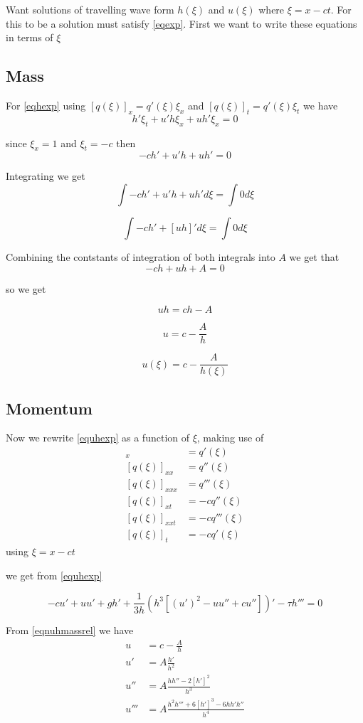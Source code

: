\documentclass[subeqn]{article}
\begin{document}
Want solutions of travelling wave form $h(\xi)$ and $u(\xi)$ where $\xi = x - ct$. For this to be a solution must satisfy \eqref{eqexp}. First we want to write these equations in terms of $\xi$

\subsection{Mass}

For \eqref{eqhexp} using $[q(\xi)]_x = q'(\xi)\xi_x$ and $[q(\xi)]_t = q'(\xi)\xi_t$ we have
\[h' \xi_t + u'h\xi_x + u h'\xi_x = 0\]

since $\xi_x = 1$ and $\xi_t = -c$ then
\[-c h' + u'h + u h' = 0\]

Integrating we get
\[ \int -c h' + u'h + u h' d\xi =  \int 0 d\xi\]

\[ \int -c h' + \left[uh\right]' d\xi =  \int 0 d\xi\]

Combining the contstants of integration of both integrals into $A$ we get that
\[ -ch + uh + A = 0  \]

so we get

\[ uh = ch - A  \]

\[ u = c - \frac{A}{h}  \]

\begin{equation}
\label{eqnuhmassrel}
u(\xi) = c - \frac{A}{h(\xi)} 
\end{equation}

\subsection{Momentum}
Now we rewrite \eqref{equhexp} as a function of $\xi$, making use of 
\begin{align*}
[q(\xi)]_x &= q'(\xi) \\
[q(\xi)]_{xx} &= q''(\xi) \\
[q(\xi)]_{xxx} &= q'''(\xi) \\
[q(\xi)]_{xt} &= -c q''(\xi) \\
[q(\xi)]_{xxt} &= -c q'''(\xi) \\
[q(\xi)]_t &= -c q'(\xi)
\end{align*}
using $\xi = x - ct$

we get from \eqref{equhexp}

\[	-cu' +  u u'  + gh' + \frac{1}{3h} \left({h^3}\left[\left(u' \right)^2 - uu'' + c u'' \right] \right)' - \tau h''' = 0\]

From \eqref{eqnuhmassrel} we have
\begin{align*}
u &= c - \frac{A}{h} \\
u' &= A \frac{h'}{h^2} \\
u'' &= A \frac{h h'' - 2\left[h'\right]^2}{h^3} \\
u''' &= A \frac{h^2 h''' + 6 \left[h'\right]^3 - 6hh'h''}{h^4} \\
\end{align*}
\end{document}
